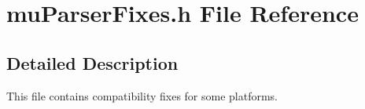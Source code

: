\section{muParserFixes.h File Reference}
\label{muParserFixes_8h}


\subsection{Detailed Description}
This file contains compatibility fixes for some platforms. 



